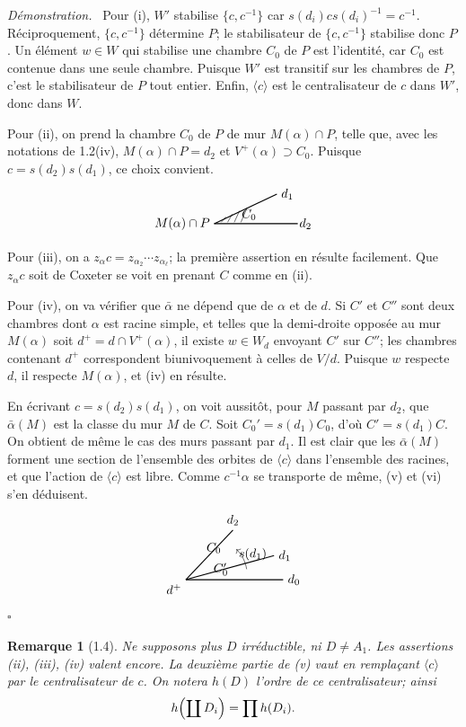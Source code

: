 \documentclass[11pt]{article}
\newcommand{\coxeterChamberOne}{%
\begin{tikzpicture}[scale=.78,baseline=-.5ex]
  \coordinate (O) at (0,0);
  \draw[thick] (O)--(3.0,0);
  \draw[thick] (O)--(2.25,1.05);
  \draw[thin] (.25,.05)--(.42,.24);
  \draw[thin] (.48,.05)--(.65,.34);
  \draw[thin] (.72,.05)--(.91,.46);
  \draw[thin] (.96,.05)--(1.18,.57);
  \node at (1.25,.32){$C_0$};
  \node[right] at (2.9,0){$d_2$};
  \node[right] at (2.25,1.05){$d_1$};
  \node[left] at (0,0){$M(\alpha)\cap P$};
\end{tikzpicture}%
}
\newcommand{\coxeterChamberTwo}{%
\begin{tikzpicture}[scale=.85,baseline=-.5ex]
  \coordinate (O) at (0,0);
  \draw[thick] (O)--(3.2,0) node[right]{$d_0$};
  \draw[thick] (O)--(2.9,.8) node[right]{$d_1$};
  \draw[thick] (O)--(1.55,1.65) node[above]{$d_2$};
  \node at (.92,1.05){$C_0$};
  \node at (1.15,.35){$C'_0$};
  \draw[->,thin] (2.0,.35) arc[start angle=9,end angle=45,radius=1.2];
  \node at (2.2,.85){$s(d_1)$};
  \node[below left] at (O){$d^+$};
\end{tikzpicture}%
}
\theoremstyle{plainfr}
\newtheorem*{remarque}{Remarque}
\newenvironment{preuve}{\par\emph{Démonstration.}\ }{\hfill$\square$\par}
\begin{document}
\begin{preuve}
Pour (i), $W'$ stabilise $\{c,c^{-1}\}$ car $s(d_i)c s(d_i)^{-1}=c^{-1}$. Réciproquement, $\{c,c^{-1}\}$ détermine $P$; le stabilisateur de $\{c,c^{-1}\}$ stabilise donc $P$. Un élément $w\in W$ qui stabilise une chambre $C_0$ de $P$ est l'identité, car $C_0$ est contenue dans une seule chambre. Puisque $W'$ est transitif sur les chambres de $P$, c'est le stabilisateur de $P$ tout entier. Enfin, $\langle c\rangle$ est le centralisateur de $c$ dans $W'$, donc dans $W$.

Pour (ii), on prend la chambre $C_0$ de $P$ de mur $M(\alpha)\cap P$, telle que, avec les notations de 1.2(iv), $M(\alpha)\cap P=d_2$ et $V^+(\alpha)\supset C_0$. Puisque $c=s(d_2)s(d_1)$, ce choix convient.
\[
\coxeterChamberOne
\]

Pour (iii), on a $z_\alpha c=z_{\alpha_2}\cdots z_{\alpha_\ell}$; la première assertion en résulte facilement. Que $z_\alpha c$ soit de Coxeter se voit en prenant $C$ comme en (ii).

Pour (iv), on va vérifier que $\bar\alpha$ ne dépend que de $\alpha$ et de $d$. Si $C'$ et $C''$ sont deux chambres dont $\alpha$ est racine simple, et telles que la demi-droite opposée au mur $M(\alpha)$ soit $d^+=d\cap V^+(\alpha)$, il existe $w\in W_d$ envoyant $C'$ sur $C''$; les chambres contenant $d^+$ correspondent biunivoquement à celles de $V/d$. Puisque $w$ respecte $d$, il respecte $M(\alpha)$, et (iv) en résulte.

En écrivant $c=s(d_2)s(d_1)$, on voit aussitôt, pour $M$ passant par $d_2$, que $\bar\alpha(M)$ est la classe du mur $M$ de $C$. Soit $C_0'=s(d_1)C_0$, d'où $C'=s(d_1)C$. On obtient de même le cas des murs passant par $d_1$. Il est clair que les $\bar\alpha(M)$ forment une section de l'ensemble des orbites de $\langle c\rangle$ dans l'ensemble des racines, et que l'action de $\langle c\rangle$ est libre. Comme $c^{-1}\alpha$ se transporte de même, (v) et (vi) s'en déduisent.
\[
\coxeterChamberTwo
\]
\end{preuve}

\begin{remarque}[1.4]
Ne supposons plus $D$ irréductible, ni $D\ne A_1$. Les assertions (ii), (iii), (iv) valent encore. La deuxième partie de (v) vaut en remplaçant $\langle c\rangle$ par le centralisateur de $c$. On notera $h(D)$ l'ordre de ce centralisateur; ainsi
\[
 h\Bigl(\coprod D_i\Bigr)=\prod h(D_i).
\]
\end{remarque}
\end{document}
